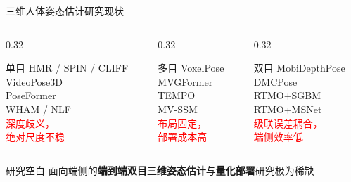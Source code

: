 \documentclass{beamer}
\begin{document}
\begin{frame}{三维人体姿态估计研究现状}
    \begin{columns}
        \begin{column}{0.32\textwidth}
            \begin{block}{\centering 单目}
                \footnotesize
                HMR / SPIN / CLIFF\\
                VideoPose3D\\
                PoseFormer\\
                WHAM / NLF\\[4pt]
                \textcolor{red}{深度歧义，\\绝对尺度不稳}
            \end{block}
        \end{column}
        \begin{column}{0.32\textwidth}
            \begin{block}{\centering 多目}
                \footnotesize
                VoxelPose\\
                MVGFormer\\
                TEMPO\\
                MV-SSM\\[4pt]
                \textcolor{red}{布局固定，\\部署成本高}
            \end{block}
        \end{column}
        \begin{column}{0.32\textwidth}
            \begin{block}{\centering 双目}
                \footnotesize
                MobiDepthPose\\
                DMCPose\\
                RTMO+SGBM\\
                RTMO+MSNet\\[4pt]
                \textcolor{red}{级联误差耦合，\\端侧效率低}
            \end{block}
        \end{column}
    \end{columns}
    \vspace{8pt}
    \begin{exampleblock}{研究空白}
        \centering 面向端侧的\textbf{端到端双目三维姿态估计}与\textbf{量化部署}研究极为稀缺
    \end{exampleblock}
\end{frame}
\end{document}
